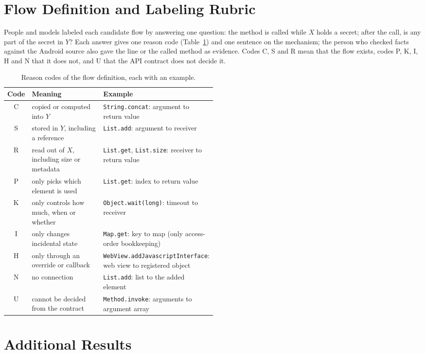 \section{Flow Definition and Labeling Rubric}
\label{app:flow}
People and models labeled each candidate flow by answering one question: the method is called while $X$ holds a secret; after the call, is any part of the secret in $Y$?
Each answer gives one reason code (Table~\ref{tab:rubric}) and one sentence on the mechanism; the person who checked facts against the Android source also gave the line or the called method as evidence.
Codes C, S and R mean that the flow exists, codes P, K, I, H and N that it does not, and U that the API contract does not decide it.

\begin{table}[h]
\caption{Reason codes of the flow definition, each with an example.}
\label{tab:rubric}
\small
\begin{tabular}{@{}cl>{\raggedright\arraybackslash}p{0.5\linewidth}@{}}
\toprule
Code & Meaning & Example\\
\midrule
C & copied or computed into $Y$ & \texttt{String.concat}: argument to return value\\
S & stored in $Y$, including a reference & \texttt{List.add}: argument to receiver\\
R & read out of $X$, including size or metadata & \texttt{List.get}, \texttt{List.size}: receiver to return value\\
P & only picks which element is used & \texttt{List.get}: index to return value\\
K & only controls how much, when or whether & \texttt{Object.wait(long)}: timeout to receiver\\
I & only changes incidental state & \texttt{Map.get}: key to map (only access-order bookkeeping)\\
H & only through an override or callback & \texttt{WebView.addJavascriptInterface}: web view to registered object\\
N & no connection & \texttt{List.add}: list to the added element\\
U & cannot be decided from the contract & \texttt{Method.invoke}: arguments to argument array\\
\bottomrule
\end{tabular}
\end{table}

\section{Additional Results}
\label{app:results}

